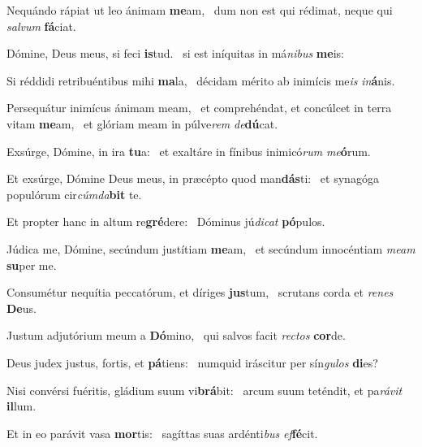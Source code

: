 \item Nequándo rápiat ut leo ánimam \textbf{me}am,~\psstar{} dum non est qui rédimat, neque qui \textit{sal}\textit{vum} \textbf{fá}ciat.

\item Dómine, Deus meus, si feci \textbf{is}tud.~\psstar{} si est iníquitas in má\textit{ni}\textit{bus} \textbf{me}is:

\item Si réddidi retribuéntibus mihi \textbf{ma}la,~\psstar{} décidam mérito ab inimícis me\textit{is} \textit{in}\textbf{á}nis.

\item Persequátur inimícus ánimam meam,~\pscross{} et comprehéndat, et concúlcet in terra vitam \textbf{me}am,~\psstar{} et glóriam meam in púlve\textit{rem} \textit{de}\textbf{dú}cat.

\item Exsúrge, Dómine, in ira \textbf{tu}a:~\psstar{} et exaltáre in fínibus inimicó\textit{rum} \textit{me}\textbf{ó}rum.

\item Et exsúrge, Dómine Deus meus, in præcépto quod man\textbf{dás}ti:~\psstar{} et synagóga populórum cir\textit{cúm}\textit{da}\textbf{bit} te.

\item Et propter hanc in altum re\textbf{gré}dere:~\psstar{} Dóminus jú\textit{di}\textit{cat} \textbf{pó}pulos.

\item Júdica me, Dómine, secúndum justítiam \textbf{me}am,~\psstar{} et secúndum innocéntiam \textit{me}\textit{am} \textbf{su}per me.

\item Consumétur nequítia peccatórum, et díriges \textbf{jus}tum,~\psstar{} scrutans corda et \textit{re}\textit{nes} \textbf{De}us.

\item Justum adjutórium meum a \textbf{Dó}mino,~\psstar{} qui salvos facit \textit{rec}\textit{tos} \textbf{cor}de.

\item Deus judex justus, fortis, et \textbf{pá}tiens:~\psstar{} numquid iráscitur per sín\textit{gu}\textit{los} \textbf{di}es?

\item Nisi convérsi fuéritis, gládium suum vi\textbf{brá}bit:~\psstar{} arcum suum teténdit, et pa\textit{rá}\textit{vit} \textbf{il}lum.

\item Et in eo parávit vasa \textbf{mor}tis:~\psstar{} sagíttas suas ardénti\textit{bus} \textit{ef}\hspace{-0.5mm}\textbf{fé}cit.

